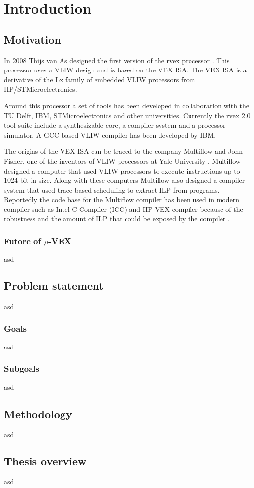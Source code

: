 \chapter{Introduction}
\section{Motivation}

In 2008 Thijs van As designed the first version of the rvex processor \cite{As:2008rt}. This processor uses a VLIW design and is based on the VEX ISA. The VEX ISA is a derivative of the Lx family of embedded VLIW processors \cite{854391} from HP/STMicroelectronics.

Around this processor a set of tools has been developed in collaboration with the TU Delft, IBM, STMicroelectronics and other universities. Currently the rvex 2.0 tool suite include a synthesizable core, a compiler system and a processor simulator. A GCC based VLIW compiler has been developed by IBM. 

The origins of the VEX ISA can be traced to the company Multiflow and John Fisher, one of the inventors of VLIW processors at Yale University \cite{Fisher:1983:VLI:1067651.801649}. Multiflow designed a computer that used VLIW processors to execute instructions up to 1024-bit in size. Along with these computers Multiflow also designed a compiler system that used trace based scheduling to extract ILP from programs. Reportedly the code base for the Multiflow compiler has been used in modern compiler such as Intel C Compiler (ICC) and HP VEX compiler because of the robustness and the amount of ILP that could be exposed by the compiler \cite{Lowney:1993qy}.


\subsection{Futore of $\rho$-VEX}
asd
\section{Problem statement}
asd
\subsection{Goals}
asd
\subsection{Subgoals}
asd
\section{Methodology}
asd
\section{Thesis overview}
asd


\acresetall
